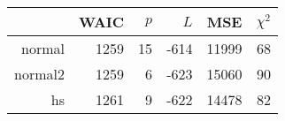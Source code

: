 \begin{tabular}{rrrrrr}
  \hline
 & WAIC & $p$ & $L$ & MSE & $\chi^2$ \\ 
  \hline
normal & 1259 & 15 & -614 & 11999 & 68 \\ 
  normal2 & 1259 & 6 & -623 & 15060 & 90 \\ 
  hs & 1261 & 9 & -622 & 14478 & 82 \\ 
   \hline
\end{tabular}
